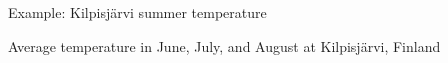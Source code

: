 \documentclass[finnish,english,t]{beamer}
\begin{document}
\begin{frame}
  
  {\Large\color{navyblue} Example: Kilpisjärvi summer temperature}

  Average temperature in June, July, and August at Kilpisjärvi, Finland

  \begin{center}
  \end{center}

\end{frame}
\end{document}
